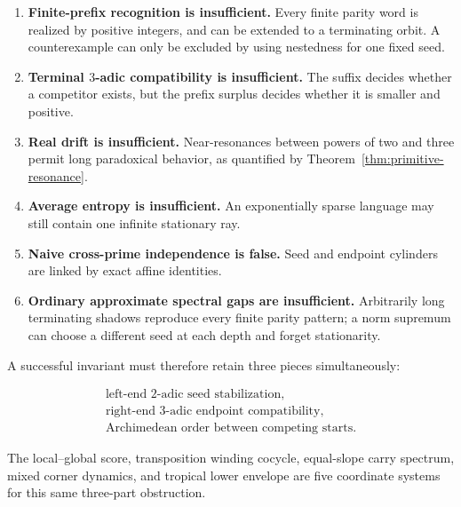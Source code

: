 \documentclass[11pt,reqno]{amsart}
\numberwithin{equation}{section}
\theoremstyle{definition}
\theoremstyle{remark}
\begin{document}
\begin{enumerate}[label=(\roman*),leftmargin=2.5em]
\item \textbf{Finite-prefix recognition is insufficient.}
Every finite parity word is realized by positive integers, and can be
extended to a terminating orbit.  A counterexample can only be excluded by
using nestedness for one fixed seed.

\item \textbf{Terminal $3$-adic compatibility is insufficient.}
The suffix decides whether a competitor exists, but the prefix surplus
decides whether it is smaller and positive.

\item \textbf{Real drift is insufficient.}
Near-resonances between powers of two and three permit long paradoxical
behavior, as quantified by Theorem~\ref{thm:primitive-resonance}.

\item \textbf{Average entropy is insufficient.}
An exponentially sparse language may still contain one infinite stationary
ray.

\item \textbf{Naive cross-prime independence is false.}
Seed and endpoint cylinders are linked by exact affine identities.

\item \textbf{Ordinary approximate spectral gaps are insufficient.}
Arbitrarily long terminating shadows reproduce every finite parity pattern;
a norm supremum can choose a different seed at each depth and forget
stationarity.
\end{enumerate}

A successful invariant must therefore retain three pieces simultaneously:

\begin{equation}\label{eq:three-ends}
\boxed{
\begin{array}{c}
\text{left-end }2\text{-adic seed stabilization},\\
\text{right-end }3\text{-adic endpoint compatibility},\\
\text{Archimedean order between competing starts}.
\end{array}}
\end{equation}

The local--global score, transposition winding cocycle, equal-slope carry
spectrum, mixed corner dynamics, and tropical lower envelope are five
coordinate systems for this same three-part obstruction.
\end{document}

